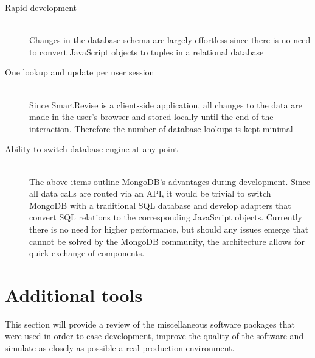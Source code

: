 \documentclass[bsc,frontabs,twoside,singlespacing,parskip]{infthesis}     %
\begin{document}
		\begin{description}
			\item[Rapid development] \hfill \\
				Changes in the database schema are largely effortless since there is no need to convert JavaScript objects to tuples in a relational database
			\item[One lookup and update per user session] \hfill \\
				Since SmartRevise is a client-side application, all changes to the data are made in the user's browser and stored locally until the end of the interaction. Therefore the number of database lookups is kept minimal
			\item[Ability to switch database engine at any point] \hfill \\
				The above items outline MongoDB's advantages during development. Since all data calls are routed via an API, it would be trivial to switch MongoDB with a traditional SQL database and develop adapters that convert SQL relations to the corresponding JavaScript objects. Currently there is no need for higher performance, but should any issues emerge that cannot be solved by the MongoDB community, the architecture allows for quick exchange of components.
		\end{description}
		
	
	\section{Additional tools}\label{tools}
	
		This section will provide a review of the miscellaneous software packages that were used in order to ease development, improve the quality of the software and simulate as closely as possible a real production environment.
		
\end{document}
